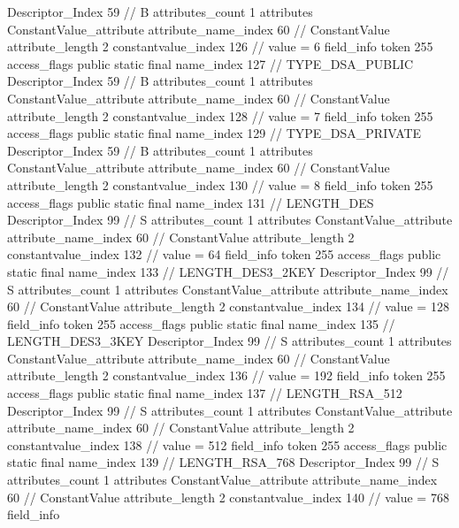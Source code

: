 {{{{{				Descriptor_Index	59		// B
				attributes_count	1
				attributes {
				ConstantValue_attribute {
					attribute_name_index	60		// ConstantValue
					attribute_length	2
					constantvalue_index	126		// value = 6
				}
				}
			}
			field_info {
				token	255
				access_flags	public static final
				name_index	127		// TYPE_DSA_PUBLIC
				Descriptor_Index	59		// B
				attributes_count	1
				attributes {
				ConstantValue_attribute {
					attribute_name_index	60		// ConstantValue
					attribute_length	2
					constantvalue_index	128		// value = 7
				}
				}
			}
			field_info {
				token	255
				access_flags	public static final
				name_index	129		// TYPE_DSA_PRIVATE
				Descriptor_Index	59		// B
				attributes_count	1
				attributes {
				ConstantValue_attribute {
					attribute_name_index	60		// ConstantValue
					attribute_length	2
					constantvalue_index	130		// value = 8
				}
				}
			}
			field_info {
				token	255
				access_flags	public static final
				name_index	131		// LENGTH_DES
				Descriptor_Index	99		// S
				attributes_count	1
				attributes {
				ConstantValue_attribute {
					attribute_name_index	60		// ConstantValue
					attribute_length	2
					constantvalue_index	132		// value = 64
				}
				}
			}
			field_info {
				token	255
				access_flags	public static final
				name_index	133		// LENGTH_DES3_2KEY
				Descriptor_Index	99		// S
				attributes_count	1
				attributes {
				ConstantValue_attribute {
					attribute_name_index	60		// ConstantValue
					attribute_length	2
					constantvalue_index	134		// value = 128
				}
				}
			}
			field_info {
				token	255
				access_flags	public static final
				name_index	135		// LENGTH_DES3_3KEY
				Descriptor_Index	99		// S
				attributes_count	1
				attributes {
				ConstantValue_attribute {
					attribute_name_index	60		// ConstantValue
					attribute_length	2
					constantvalue_index	136		// value = 192
				}
				}
			}
			field_info {
				token	255
				access_flags	public static final
				name_index	137		// LENGTH_RSA_512
				Descriptor_Index	99		// S
				attributes_count	1
				attributes {
				ConstantValue_attribute {
					attribute_name_index	60		// ConstantValue
					attribute_length	2
					constantvalue_index	138		// value = 512
				}
				}
			}
			field_info {
				token	255
				access_flags	public static final
				name_index	139		// LENGTH_RSA_768
				Descriptor_Index	99		// S
				attributes_count	1
				attributes {
				ConstantValue_attribute {
					attribute_name_index	60		// ConstantValue
					attribute_length	2
					constantvalue_index	140		// value = 768
				}
				}
			}
			field_info {
}}}}}
